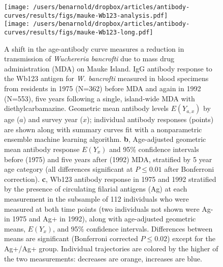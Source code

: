 \documentclass[11pt]{article}
\begin{document}
\begin{figure}[htbp]
\begin{center}
\texttt{[image: /users/benarnold/dropbox/articles/antibody-curves/results/figs/mauke-Wb123-analysis.pdf]} \\
\texttt{[image: /users/benarnold/dropbox/articles/antibody-curves/results/figs/mauke-Wb123-long.pdf]}
\begin{minipage}{\textwidth}
\caption{A shift in the age-antibody curve measures a reduction in transmission of \textit{Wuchereria bancrofti} due to mass drug administration (MDA) on Mauke Island.  IgG antibody response to the Wb123 antigen for \textit{W. bancrofti} measured in blood specimens from residents in 1975 (N=362) before MDA and again in 1992 (N=553), five years following a single, island-wide MDA with diethylcarbamazine. Geometric mean antibody levels $E(Y_{a,x})$ by age ($a$) and survey year ($x$); individual antibody responses (points) are shown along with summary curves fit with a nonparametric ensemble machine learning algorithm. \textbf{b}, Age-adjusted geometric mean antibody response $E(Y_{x})$ and 95\% confidence intervals before (1975) and five years after (1992) MDA, stratified by 5 year age category (all differences significant at $P\leq0.01$ after Bonferroni correction). \textbf{c}, Wb123 antibody response in 1975 and 1992 stratified by the presence of circulating filarial antigens (Ag) at each measurement in the subsample of 112 individuals who were measured at both time points (two individuals not shown were Ag- in 1975 and Ag+ in 1992), along with age-adjusted geometric means, $E(Y_{x})$, and 95\% confidence intervals. Differences between means are significant (Bonferroni corrected $P\leq0.02$) except for the Ag+/Ag+ group. Individual trajectories are colored by the higher of the two measurements: decreases are orange, increases are blue. }
\label{fig:mauke}
\end{minipage}
\end{center}
\end{figure}
\end{document}
